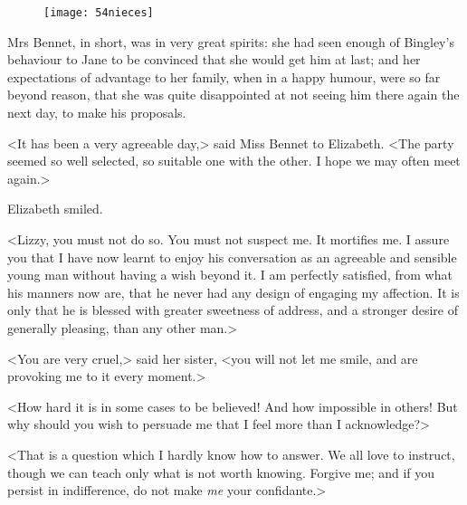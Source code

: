 \begin{figure}[tbh]
\centering
\texttt{[image: 54nieces]}
\end{figure}

Mrs Bennet, in short, was in very great spirits: she had seen enough of Bingley's behaviour to Jane to be convinced that she would get him at last; and her expectations of advantage to her family, when in a happy humour, were so far beyond reason, that she was quite disappointed at not seeing him there again the next day, to make his proposals.

<It has been a very agreeable day,> said Miss Bennet to Elizabeth. <The party seemed so well selected, so suitable one with the other. I hope we may often meet again.>

Elizabeth smiled.

<Lizzy, you must not do so. You must not suspect me. It mortifies me. I assure you that I have now learnt to enjoy his conversation as an agreeable and sensible young man without having a wish beyond it. I am perfectly satisfied, from what his manners now are, that he never had any design of engaging my affection. It is only that he is blessed with greater sweetness of address, and a stronger desire of generally pleasing, than any other man.>

<You are very cruel,> said her sister, <you will not let me smile, and are provoking me to it every moment.>

<How hard it is in some cases to be believed! And how impossible in others! But why should you wish to persuade me that I feel more than I acknowledge?>

<That is a question which I hardly know how to answer. We all love to instruct, though we can teach only what is not worth knowing. Forgive me; and if you persist in indifference, do not make \textit{me} your confidante.>